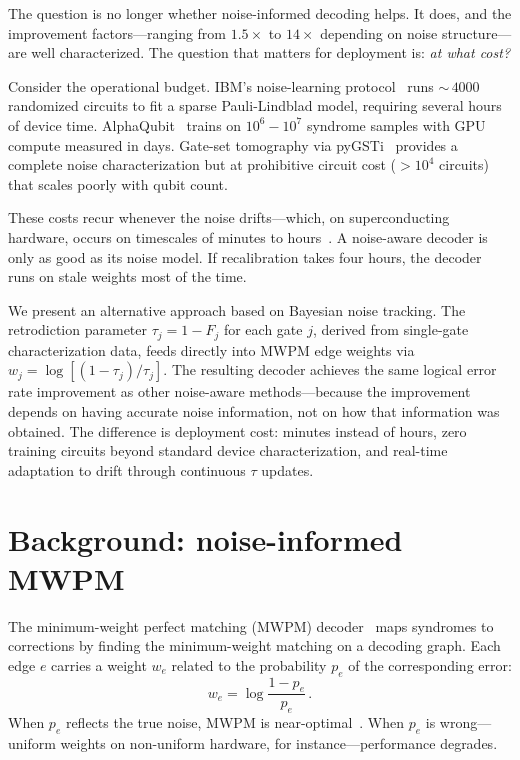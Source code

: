 \documentclass[prl,twocolumn,superscriptaddress,longbibliography]{revtex4-2}
\begin{document}
The question is no longer whether noise-informed decoding helps. It does, and the improvement factors---ranging from $1.5\times$ to $14\times$ depending on noise structure---are well characterized. The question that matters for deployment is: \emph{at what cost?}

Consider the operational budget. IBM's noise-learning protocol~\cite{vandenBerg2023,Kim2023} runs ${\sim}\,4000$ randomized circuits to fit a sparse Pauli-Lindblad model, requiring several hours of device time. AlphaQubit~\cite{AlphaQubit2024} trains on $10^6{-}10^7$ syndrome samples with GPU compute measured in days. Gate-set tomography via pyGSTi~\cite{Nielsen2021} provides a complete noise characterization but at prohibitive circuit cost ($>10^4$ circuits) that scales poorly with qubit count.

These costs recur whenever the noise drifts---which, on superconducting hardware, occurs on timescales of minutes to hours~\cite{GoogleWillow2024}. A noise-aware decoder is only as good as its noise model. If recalibration takes four hours, the decoder runs on stale weights most of the time.

We present an alternative approach based on Bayesian noise tracking. The retrodiction parameter $\tau_j = 1 - F_j$ for each gate $j$, derived from single-gate characterization data, feeds directly into MWPM edge weights via $w_j = \log[(1-\tau_j)/\tau_j]$. The resulting decoder achieves the same logical error rate improvement as other noise-aware methods---because the improvement depends on having accurate noise information, not on how that information was obtained. The difference is deployment cost: minutes instead of hours, zero training circuits beyond standard device characterization, and real-time adaptation to drift through continuous $\tau$ updates.

\section{Background: noise-informed MWPM}

The minimum-weight perfect matching (MWPM) decoder~\cite{Higgott2023,Dennis2002} maps syndromes to corrections by finding the minimum-weight matching on a decoding graph. Each edge $e$ carries a weight $w_e$ related to the probability $p_e$ of the corresponding error:
\begin{equation}\label{eq:weight}
  w_e = \log\frac{1 - p_e}{p_e}\,.
\end{equation}
When $p_e$ reflects the true noise, MWPM is near-optimal~\cite{Fowler2012}. When $p_e$ is wrong---uniform weights on non-uniform hardware, for instance---performance degrades.
\end{document}
